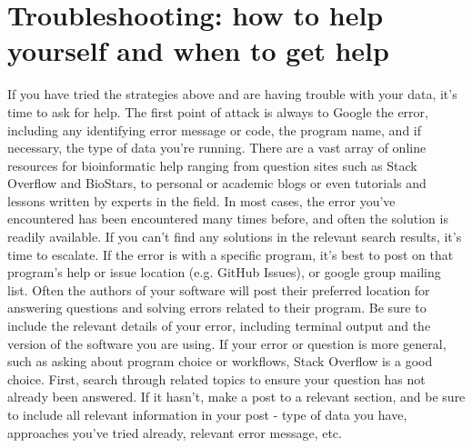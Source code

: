 \documentclass[10pt,letterpaper]{article}
\begin{document}
\section*{Troubleshooting: how to help yourself and when to get help}

If you have tried the strategies above and are having trouble with your data, it’s time to ask for help. 
The first point of attack is always to Google the error, including any identifying error message or code, the program name, and if necessary, the type of data you’re running. 
There are a vast array of online resources for bioinformatic help ranging from question sites such as Stack Overflow and BioStars, to personal or academic blogs or even tutorials and lessons written by experts in the field. 
In most cases, the error you’ve encountered has been encountered many times before, and often the solution is readily available. 
If you can’t find any solutions in the relevant search results, it’s time to escalate. 
If the error is with a specific program, it’s best to post on that program’s help or issue location (e.g. GitHub Issues), or google group mailing list. 
Often the authors of your software will post their preferred location for answering questions and solving errors related to their program. 
Be sure to include the relevant details of your error, including terminal output and the version of the software you are using.
 If your error or question is more general, such as asking about program choice or workflows, Stack Overflow is a good choice. 
First, search through related topics to ensure your question has not already been answered. 
If it hasn’t, make a post to a relevant section, and be sure to include all relevant information in your post - type of data you have, approaches you’ve tried already, relevant error message, etc. 
\end{document}
